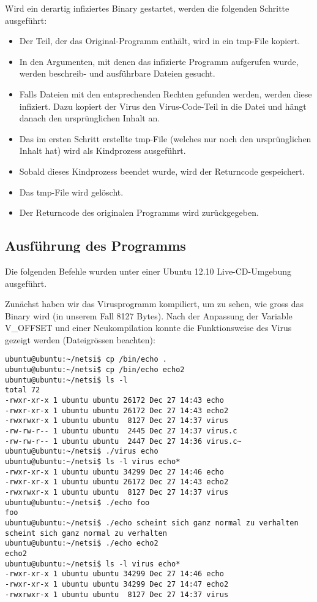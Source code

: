 \documentclass[a4paper,11pt,parskip=half]{scrartcl}
\begin{document}
Wird ein derartig infiziertes Binary gestartet, werden die folgenden Schritte ausgeführt:
\begin{itemize}
	\item Der Teil, der das Original-Programm enthält, wird in ein tmp-File kopiert.
	\item In den Argumenten, mit denen das infizierte Programm aufgerufen wurde, werden beschreib- und ausführbare Dateien gesucht.
	\item Falls Dateien mit den entsprechenden Rechten gefunden werden, werden diese infiziert. Dazu kopiert der Virus den Virus-Code-Teil in die Datei und hängt danach den ursprünglichen Inhalt an.
	\item Das im ersten Schritt erstellte tmp-File (welches nur noch den ursprünglichen Inhalt hat) wird als Kindprozess ausgeführt.
	\item Sobald dieses Kindprozess beendet wurde, wird der Returncode gespeichert.
	\item Das tmp-File wird gelöscht.
	\item Der Returncode des originalen Programms wird zurückgegeben.
\end{itemize}

\subsection{Ausführung des Programms}
Die folgenden Befehle wurden unter einer Ubuntu 12.10 Live-CD-Umgebung ausgeführt.

Zunächst haben wir das Virusprogramm kompiliert, um zu sehen, wie gross das Binary wird (in unserem Fall 8127 Bytes). Nach der Anpassung der Variable V\_OFFSET und einer Neukompilation konnte die Funktionsweise des Virus gezeigt werden (Dateigrössen beachten):

\begin{lstlisting}
ubuntu@ubuntu:~/netsi$ cp /bin/echo .
ubuntu@ubuntu:~/netsi$ cp /bin/echo echo2
ubuntu@ubuntu:~/netsi$ ls -l
total 72
-rwxr-xr-x 1 ubuntu ubuntu 26172 Dec 27 14:43 echo
-rwxr-xr-x 1 ubuntu ubuntu 26172 Dec 27 14:43 echo2
-rwxrwxr-x 1 ubuntu ubuntu  8127 Dec 27 14:37 virus
-rw-rw-r-- 1 ubuntu ubuntu  2445 Dec 27 14:37 virus.c
-rw-rw-r-- 1 ubuntu ubuntu  2447 Dec 27 14:36 virus.c~
ubuntu@ubuntu:~/netsi$ ./virus echo
ubuntu@ubuntu:~/netsi$ ls -l virus echo*
-rwxr-xr-x 1 ubuntu ubuntu 34299 Dec 27 14:46 echo
-rwxr-xr-x 1 ubuntu ubuntu 26172 Dec 27 14:43 echo2
-rwxrwxr-x 1 ubuntu ubuntu  8127 Dec 27 14:37 virus
ubuntu@ubuntu:~/netsi$ ./echo foo
foo
ubuntu@ubuntu:~/netsi$ ./echo scheint sich ganz normal zu verhalten
scheint sich ganz normal zu verhalten
ubuntu@ubuntu:~/netsi$ ./echo echo2
echo2
ubuntu@ubuntu:~/netsi$ ls -l virus echo*
-rwxr-xr-x 1 ubuntu ubuntu 34299 Dec 27 14:46 echo
-rwxr-xr-x 1 ubuntu ubuntu 34299 Dec 27 14:47 echo2
-rwxrwxr-x 1 ubuntu ubuntu  8127 Dec 27 14:37 virus
\end{lstlisting}
\end{document}
